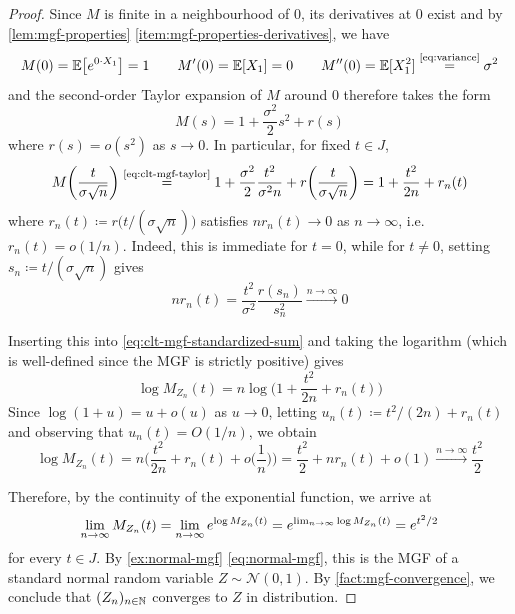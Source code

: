 \begin{proof}
Since $M$ is finite in a neighbourhood of $0$, its derivatives at $0$ exist and by \autoref{lem:mgf-properties} \ref{item:mgf-properties-derivatives}, we have
\[
M(0)
=
\operatorname{\mathbb{E}}\bigl[e^{0\cdot X_1}\bigr]
=
1
\qquad
M'(0)
=
\operatorname{\mathbb{E}}[X_1]
=
0
\qquad
M''(0)
=
\operatorname{\mathbb{E}}[X_1^2]
\overset{\text{\eqref{eq:variance}}}{=}
\sigma^2
\]
and the second-order Taylor expansion of $M$ around $0$ therefore takes the form
\begin{equation}\label{eq:clt-mgf-taylor}
M(s)
=
1
+\frac{\sigma^2}{2}s^2
+r(s)
\end{equation}
where $r(s)=o(s^2)$ as $s\to0$.
In particular, for fixed $t\in J$,
\[
M\biggl(\frac{t}{\sigma\sqrt{n}}\biggr)
\overset{\text{\eqref{eq:clt-mgf-taylor}}}{=}
1
+\frac{\sigma^2}{2}\frac{t^2}{\sigma^2n}
+r\biggl(\frac{t}{\sigma\sqrt{n}}\biggr)
=
1
+\frac{t^2}{2n}
+r_n(t)
\]
where
\(
r_n(t)
\coloneq
r\bigl(t/(\sigma\sqrt{n})\bigr)
\)
satisfies $nr_n(t)\to0$ as $n\to\infty$, i.e. $r_n(t)=o(1/n)$.
Indeed, this is immediate for $t=0$, while for $t\neq0$, setting $s_n\coloneq t/(\sigma\sqrt{n})$ gives
\[
nr_n(t)
=
\frac{t^2}{\sigma^2}
\frac{r(s_n)}{s_n^2}
\xrightarrow{n\to\infty}
0
\]

Inserting this into \eqref{eq:clt-mgf-standardized-sum} and taking the logarithm (which is well-defined since the MGF is strictly positive) gives
\[
\log M_{Z_n}(t)
=
n\log\biggl(1+\frac{t^2}{2n}+r_n(t)\biggr)
\]
Since $\log(1+u)=u+o(u)$ as $u\to0$, letting
\(
u_n(t)
\coloneq
t^2/(2n)+r_n(t)
\)
and observing that $u_n(t)=O(1/n)$, we obtain
\[
\log M_{Z_n}(t)
=
n\biggl(\frac{t^2}{2n}+r_n(t)+o\biggl(\frac{1}{n}\biggr)\biggr)
=
\frac{t^2}{2}
+nr_n(t)
+o(1)
\xrightarrow{n\to\infty}
\frac{t^2}{2}
\]

Therefore, by the continuity of the exponential function, we arrive at
\[
\lim_{n\to\infty}M_{Z_n}(t)
=
\lim_{n\to\infty}e^{\log M_{Z_n}(t)}
=
e^{\lim_{n\to\infty}\log M_{Z_n}(t)}
=
e^{t^2/2}
\]
for every $t\in J$.
By \autoref{ex:normal-mgf} \eqref{eq:normal-mgf}, 
this
is the MGF of a standard normal random variable $Z \allowbreak \sim \allowbreak \mathcal{N}(0,1)$.
By \autoref{fact:mgf-convergence}, we conclude that $(Z_n)_{n\in\mathbb{N}}$ converges to $Z$ in distribution.
\end{proof}








